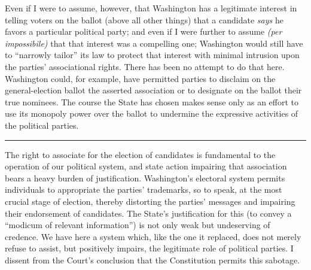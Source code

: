   Even if I were to assume, however, that Washington has a legitimate
interest in telling voters on the ballot (above all other things) that a
candidate \emph{says} he favors a particular political party; and even if
I were further to assume \emph{(per impossibile)} that that interest was a
compelling one; Washington would still have to ``narrowly tailor'' its
law to protect that interest with minimal intrusion upon the parties'
associational rights. There has been no attempt to do that here.
Washington could, for example, have permitted parties to disclaim on the
general-election ballot the asserted association or to designate on the
ballot their true nominees. The course the State has chosen makes sense
only as an effort to use its monopoly power over the ballot to undermine
the expressive activities of the political parties.

\hrule

  The right to associate for the election of candidates is fundamental
to the operation of our political system, and state action impairing
that association bears a heavy burden of justification. Washington's
electoral system permits individuals to appropriate the parties'
trademarks, so to speak, at the most crucial stage of election, thereby
distorting the parties' messages and impairing their endorsement
of candidates. The State's justification for this (to convey a
``modicum of relevant information'') is not only weak but undeserving
of credence. We have here a system which, like the one it replaced, does
not merely refuse to assist, but positively impairs, the legitimate role
of political parties. I dissent from the Court's conclusion that the
Constitution permits this sabotage.
